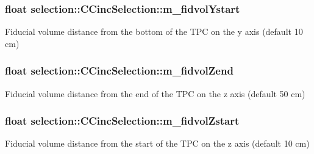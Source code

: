 \subsubsection[{\texorpdfstring{m\+\_\+fidvol\+Ystart}{m_fidvolYstart}}]{\setlength{\rightskip}{0pt plus 5cm}float selection\+::\+C\+Cinc\+Selection\+::m\+\_\+fidvol\+Ystart\hspace{0.3cm}{\ttfamily [private]}}\hypertarget{classselection_1_1CCincSelection_a28900415eda1eb30d6263081e943e6a5}{}\label{classselection_1_1CCincSelection_a28900415eda1eb30d6263081e943e6a5}
Fiducial volume distance from the bottom of the T\+PC on the y axis (default 10 cm) 
\subsubsection[{\texorpdfstring{m\+\_\+fidvol\+Zend}{m_fidvolZend}}]{\setlength{\rightskip}{0pt plus 5cm}float selection\+::\+C\+Cinc\+Selection\+::m\+\_\+fidvol\+Zend\hspace{0.3cm}{\ttfamily [private]}}\hypertarget{classselection_1_1CCincSelection_a2510a29ed7584b2d56eb8dff636ceee6}{}\label{classselection_1_1CCincSelection_a2510a29ed7584b2d56eb8dff636ceee6}
Fiducial volume distance from the end of the T\+PC on the z axis (default 50 cm) 
\subsubsection[{\texorpdfstring{m\+\_\+fidvol\+Zstart}{m_fidvolZstart}}]{\setlength{\rightskip}{0pt plus 5cm}float selection\+::\+C\+Cinc\+Selection\+::m\+\_\+fidvol\+Zstart\hspace{0.3cm}{\ttfamily [private]}}\hypertarget{classselection_1_1CCincSelection_a291cc5986c0861bf1883ec1c41457afd}{}\label{classselection_1_1CCincSelection_a291cc5986c0861bf1883ec1c41457afd}
Fiducial volume distance from the start of the T\+PC on the z axis (default 10 cm) 
